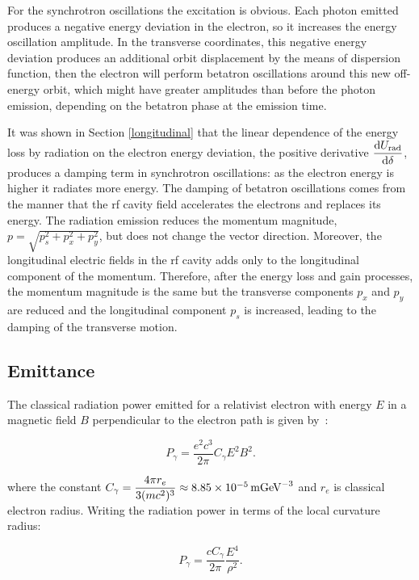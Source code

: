 For the synchrotron oscillations the excitation is obvious. Each photon emitted produces a negative energy deviation in the electron, so it increases the energy oscillation amplitude. In the transverse coordinates, this negative energy deviation produces an additional orbit displacement by the means of dispersion function, then the electron will perform betatron oscillations around this new off-energy orbit, which might have greater amplitudes than before the photon emission, depending on the betatron phase at the emission time.

It was shown in Section \ref{longitudinal} that the linear dependence of the energy loss by radiation on the electron energy deviation, the positive derivative $\dfrac{\mathrm{d} U_{\mathrm{rad}}}{\mathrm{d} \delta}$, produces a damping term in synchrotron oscillations: as the electron energy is higher it radiates more energy. The damping of betatron oscillations comes from the manner that the \gls{rf} cavity field accelerates the electrons and replaces its energy. The radiation emission reduces the momentum magnitude, $p = \sqrt{p_s
^2+ p_x^2 +p_y^2}$, but does not change the vector direction. Moreover, the longitudinal electric fields in the \gls{rf} cavity adds only to the longitudinal component of the momentum. Therefore, after the energy loss and gain processes, the momentum magnitude is the same but the transverse components $p_x$ and $p_y$ are reduced and the longitudinal component $p_s$ is increased, leading to the damping of the transverse motion.

\subsection{Emittance}

The classical radiation power emitted for a relativist electron with energy $E$ in a magnetic field $B$ perpendicular to the electron path is given by~\cite{jackson}:

\begin{equation}
    P_{\gamma} = \dfrac{e^2c^3}{2\pi} C_{\gamma} E^2 B^2.
\end{equation}

where the constant $C_{\gamma} = \dfrac{4 \pi r_e}{3 (mc^2)^3} \approx \SI{8.85e-5}{\metre {\giga \electronvolt}^{-3}}$ and $r_e$ is classical electron radius. Writing the radiation power in terms of the local curvature radius:

\begin{equation}
    P_{\gamma} = \dfrac{cC_{\gamma}}{2\pi} \dfrac{E^4}{\rho^2}.
\end{equation}

